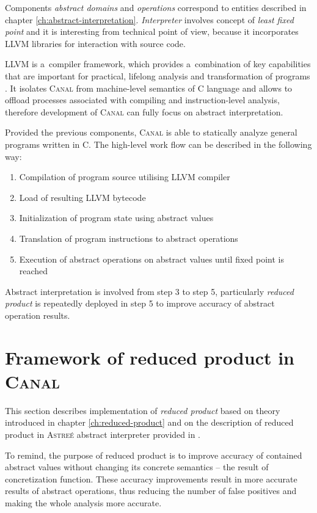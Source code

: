 \documentclass[12pt,oneside]{fithesis2}
\theoremstyle{definition}
\begin{document}
Components \textit{abstract domains} and \textit{operations} correspond to entities described in chapter \ref{ch:abstract-interpretation}. \textit{Interpreter} involves concept of \textit{least fixed point} and it is interesting from technical point of view, because it incorporates LLVM libraries for interaction with source code.

LLVM is a~compiler framework, which provides a~combination of key capabilities that are important for practical, lifelong analysis and
transformation of programs \cite{llvm}. It isolates \textsc{Canal} from machine-level semantics of C language and allows to offload processes associated with compiling and instruction-level analysis, therefore development of \textsc{Canal} can fully focus on abstract interpretation.

Provided the previous components, \textsc{Canal} is able to statically analyze general programs written in C. The high-level work flow can be described in the following way:

\begin{enumerate}
  \item Compilation of program source utilising LLVM compiler
  \item Load of resulting LLVM bytecode
  \item Initialization of program state using abstract values
  \item Translation of program instructions to abstract operations
  \item Execution of abstract operations on abstract values until fixed point is reached
\end{enumerate}

Abstract interpretation is involved from step 3 to step 5, particularly \textit{reduced product} is repeatedly deployed in step 5 to improve accuracy of abstract operation results.

\section{Framework of reduced product in \textsc{Canal}}

This section describes implementation of \textit{reduced product} based on theory introduced in chapter \ref{ch:reduced-product} and on the description of reduced product in \textsc{Astreé} abstract interpreter provided in \cite{CousotEtAl06-ASIAN}.

To remind, the purpose of reduced product is to improve accuracy of contained abstract values without changing its concrete semantics -- the result of concretization function. These accuracy improvements result in more accurate results of abstract operations, thus reducing the number of false positives and making the whole analysis more accurate.
\end{document}
